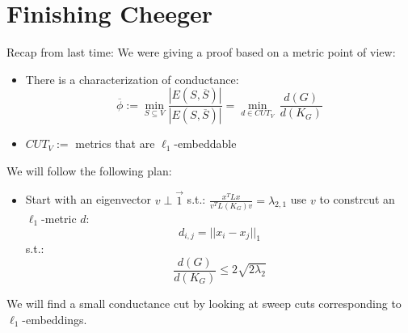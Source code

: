 \documentclass[11pt]{article}
\begin{document}

\section*{Finishing Cheeger}
Recap from last time: We were giving a proof based on a metric point of view:
\begin{itemize}
    \item There is a characterization of conductance:
    \[
        \overline{\phi}:= \underset{S \subseteq V}{\min} \frac{|E(S,\overline{S})|}{|E(S,\overline{S})|} = \underset{d \in CUT_V}{\min} \, \frac{d(G)}{d(K_G)}
    \]
    \item $CUT_V:= $ metrics that are $\ell_1$-embeddable
\end{itemize}

We will follow the following plan:
\begin{itemize}
    \item Start with an eigenvector $v \perp \vec{1}$ s.t.: $\frac{x^TLx}{v^TL(K_G)v} = \lambda_{2,1}$ use $v$ to constrcut an $\ell_1$-metric $d$:
    \[
        d_{i,j}= || x_i - x_j||_1
    \]
    s.t.:
    \[
        \frac{d(G)}{d(K_G)}  \leq 2 \sqrt{2 \lambda_2}
    \]
\end{itemize}

We will find a small conductance cut by looking at sweep cuts corresponding to $\ell_1$-embeddings.
\end{document}
